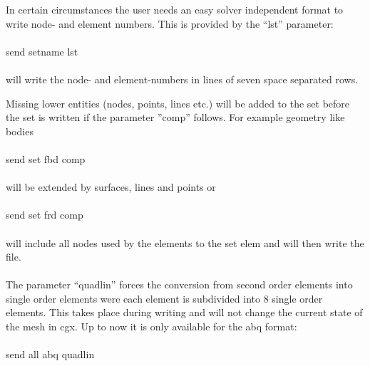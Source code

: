 \documentclass{article}
\begin{document}
In certain circumstances the user needs an easy solver independent format to write node- and element numbers. This is provided by the ``lst'' parameter:\\\\send setname lst\\\\will write the node- and element-numbers in lines of seven space separated rows.

Missing lower entities (nodes, points, lines etc.)  will be added to the set before the set is written if the parameter ''comp'' follows. For example geometry like bodies\\\\send set fbd comp\\\\will be extended by surfaces, lines and points or\\\\send set frd comp\\\\will include all nodes used by the elements to the set elem and will then write the file.\\\\
The parameter ``quadlin'' forces the conversion from second order elements into single order elements were each element is subdivided into 8 single order elements. This takes place during writing and will not change the current state of the mesh in cgx. Up to now it is only available for the abq format:\\\\send all abq quadlin\\\\
\end{document}
